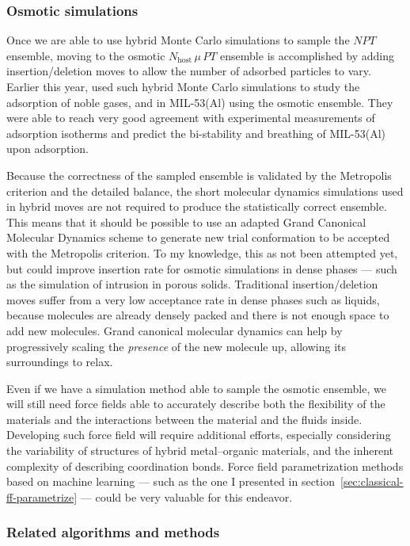 \documentclass[thesis]{subfiles}
\begin{document}
\subsubsection{Osmotic simulations}

Once we are able to use hybrid Monte Carlo simulations to sample the $NPT$
ensemble, moving to the osmotic $N_\text{host}\,\mu\,PT$ ensemble is
accomplished by adding insertion/deletion moves to allow the number of adsorbed
particles to vary. Earlier this year, \citeauthor{Rogge2019}\cite{Rogge2019} used
such hybrid Monte Carlo simulations to study the adsorption of noble gases, 
and  in MIL-53(Al) using the osmotic ensemble. They were able to reach
very good agreement with experimental measurements of adsorption isotherms and
predict the bi-stability and breathing of MIL-53(Al) upon adsorption.

Because the correctness of the sampled ensemble is validated by the Metropolis
criterion and the detailed balance, the short molecular dynamics simulations
used in hybrid moves are not required to produce the statistically correct
ensemble. This means that it should be possible to use an adapted Grand
Canonical Molecular Dynamics scheme to generate new trial conformation to be
accepted with the Metropolis criterion. To my knowledge, this as not been
attempted yet, but could improve insertion rate for osmotic simulations in dense
phases --- such as the simulation of intrusion in porous solids. Traditional
insertion/deletion moves suffer from a very low acceptance rate in dense phases
such as liquids, because molecules are already densely packed and there is not
enough space to add new molecules. Grand canonical molecular dynamics can help
by progressively scaling the \emph{presence} of the new molecule up, allowing
its surroundings to relax.

Even if we have a simulation method able to sample the osmotic ensemble, we will
still need force fields able to accurately describe both the flexibility of the
materials and the interactions between the material and the fluids inside.
Developing such force field will require additional efforts, especially
considering the variability of structures of hybrid metal--organic materials,
and the inherent complexity of describing coordination bonds. Force field
parametrization methods based on machine learning --- such as the one I
presented in section~\ref{sec:classical-ff-parametrize} --- could be very
valuable for this endeavor.

\subsubsection{Related algorithms and methods}
\end{document}
